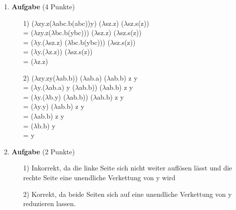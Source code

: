 \documentclass[11pt]{article}
\newcommand{\punkte}[1]{{\small{ }(#1 Punkte)}}
\newcommand{\aufgabe}[1]{\item{\bf #1}}
\begin{document}
\begin{enumerate}
\aufgabe{Aufgabe}\punkte{4}
\begin{itemize}
\item[1)]($\lambda$zy.z($\lambda$abc.b(abc))y) ($\lambda$sz.z) ($\lambda$sz.s(z))\\
= ($\lambda$zy.z($\lambda$bc.b(ybc))) ($\lambda$sz.z) ($\lambda$sz.s(z))\\
= ($\lambda$y.($\lambda$sz.z) ($\lambda$bc.b(ybc))) ($\lambda$sz.s(z))\\
= ($\lambda$y.($\lambda$z.z)) ($\lambda$sz.s(z))\\
= ($\lambda$z.z)

\item[2)]($\lambda$zy.zy($\lambda$ab.b)) ($\lambda$ab.a) ($\lambda$ab.b) z y\\
= ($\lambda$y.($\lambda$ab.a) y ($\lambda$ab.b)) ($\lambda$ab.b) z y\\
= ($\lambda$y.($\lambda$b.y) ($\lambda$ab.b)) ($\lambda$ab.b) z y\\
= ($\lambda$y.y) ($\lambda$ab.b) z y\\
= ($\lambda$ab.b) z y\\
= ($\lambda$b.b) y\\
= y
\end{itemize}

\aufgabe{Aufgabe}\punkte{2}
\begin{itemize}
\item[1)] Inkorrekt, da die linke Seite sich nicht weiter auflösen lässt und die rechte Seite eine unendliche Verkettung von y wird
\item[2)] Korrekt, da beide Seiten sich auf eine unendliche Verkettung von y reduzieren lassen.
\end{itemize}
\end{enumerate}
\end{document}
